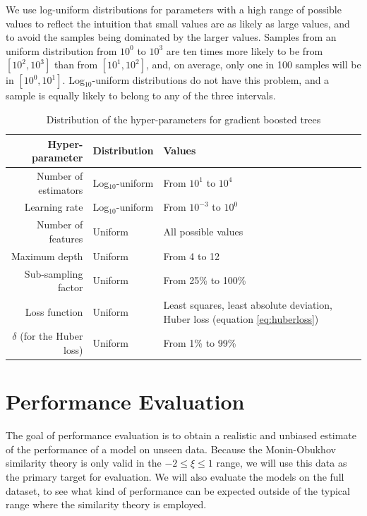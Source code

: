 \documentclass[a4paper]{book}
\begin{document}
We use log-uniform distributions for parameters with a high range of possible values to reflect the intuition that small values are as likely as large values, and to avoid the samples being dominated by the larger values. Samples from an uniform distribution from $10^0$ to $10^3$ are ten times more likely to be from $[10^2,10^3]$ than from $[10^1,10^2]$, and, on average, only one in 100 samples will be in $[10^0,10^1]$. Log$_{10}$-uniform distributions do not have this problem, and a sample is equally likely to belong to any of the three intervals.

\begin{table}[]
\centering
\caption{Distribution of the hyper-parameters for gradient boosted trees}
\label{tbl:gb_hyperparams}
\begin{tabularx}{\textwidth}{r|l|X}
\toprule
\textbf{Hyper-parameter} & \textbf{Distribution} & \textbf{Values} \\ \midrule
Number of estimators & Log$_{10}$-uniform & From $10^1$ to $10^4$ \\
Learning rate & Log$_{10}$-uniform & From $10^{-3}$ to $10^0$ \\
Number of features & Uniform & All possible values \\
Maximum depth & Uniform & From 4 to 12 \\
Sub-sampling factor & Uniform & From 25\% to 100\% \\
Loss function & Uniform & Least squares, least absolute deviation, \newline Huber loss (equation \ref{eq:huberloss}) \\
$\delta$ (for the Huber loss) & Uniform & From 1\% to 99\% \\
\bottomrule
\end{tabularx}
\end{table}



\section{Performance Evaluation}
\label{sec:perf_eval}
The goal of performance evaluation is to obtain a realistic and unbiased estimate of the performance of a model on unseen data. Because the Monin-Obukhov similarity theory is only valid in the $-2\leq\xi\leq1$ range, we will use this data as the primary target for evaluation. We will also evaluate the models on the full dataset, to see what kind of performance can be expected outside of the typical range where the similarity theory is employed.
\end{document}
